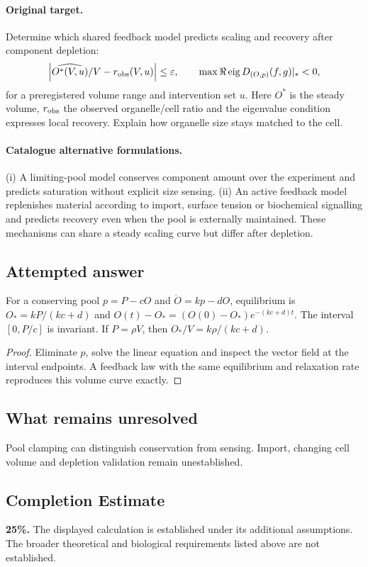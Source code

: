 \documentclass[11pt]{article}
\begin{document}
\paragraph{Original target.}
Determine which shared feedback model predicts scaling and recovery after component depletion:
\[
\left|\widehat{O^*(V,u)}/V-r_{\rm obs}(V,u)\right|\leq\varepsilon,
\qquad \max\Re\operatorname{eig}D_{(O,p)}(f,g)|_*<0,
\]
for a preregistered volume range and intervention set $u$. Here $O^*$ is the steady volume, $r_{\rm obs}$ the observed organelle/cell ratio and the eigenvalue condition expresses local recovery. Explain how organelle size stays matched to the cell.
\paragraph{Catalogue alternative formulations.}
(i) A limiting-pool model conserves component amount over the experiment and predicts saturation without explicit size sensing. (ii) An active feedback model replenishes material according to import, surface tension or biochemical signalling and predicts recovery even when the pool is externally maintained. These mechanisms can share a steady scaling curve but differ after depletion.
\subsection{Attempted answer}
\begin{proposition}
For a conserving pool $p=P-cO$ and $\dot O=kp-dO$, equilibrium is $O_*=kP/(kc+d)$ and $O(t)-O_*=(O(0)-O_*)e^{-(kc+d)t}$. The interval $[0,P/c]$ is invariant. If $P=\rho V$, then $O_*/V=k\rho/(kc+d)$.
\end{proposition}
\begin{proof}
Eliminate $p$, solve the linear equation and inspect the vector field at the interval endpoints. A feedback law with the same equilibrium and relaxation rate reproduces this volume curve exactly.
\end{proof}
\subsection{What remains unresolved}
Pool clamping can distinguish conservation from sensing. Import, changing cell volume and depletion validation remain unestablished.
\subsection{Completion Estimate}
\textbf{25\%.} The displayed calculation is established under its additional assumptions. The broader theoretical and biological requirements listed above are not established.
\end{document}
